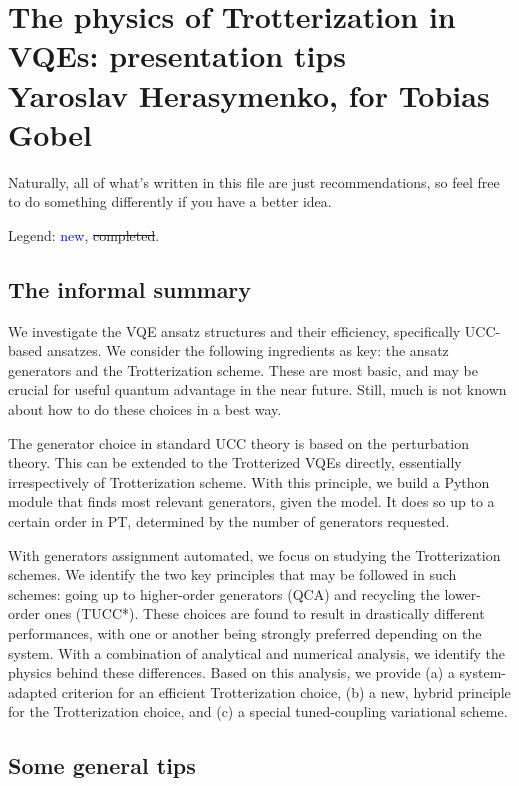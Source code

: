 \documentclass[10pt, a4paper]{article}
\def\blue{\textcolor{blue}}
\begin{document}
\section*{The physics of Trotterization in VQEs: presentation tips\\
\small{Yaroslav Herasymenko, for Tobias Gobel}}


Naturally, all of what's written in this file are just recommendations, so feel free to do something differently if you have a better idea.

Legend: \blue{new}, \st{completed}.

\subsection*{The informal summary}

We investigate the VQE ansatz structures and their efficiency, specifically UCC-based ansatzes. We consider the following ingredients as key: the ansatz generators and the Trotterization scheme. These are most basic, and may be crucial for useful quantum advantage in the near future. Still, much is not known about how to do these choices in a best way.

The generator choice in standard UCC theory is based on the perturbation theory. This can be extended to the Trotterized VQEs directly, essentially irrespectively of Trotterization scheme. With this principle, we build a Python module that finds most relevant generators, given the model. It does so up to a certain order in PT, determined by the number of generators requested.

With generators assignment automated, we focus on studying the Trotterization schemes. We identify the two key principles that may be followed in such schemes: going up to higher-order generators (QCA) and recycling the lower-order ones (TUCC*). These choices are found to result in drastically different performances, with one or another being strongly preferred depending on the system. With a combination of analytical and numerical analysis, we identify the physics behind these differences. Based on this analysis, we provide (a) a system-adapted criterion for an efficient Trotterization choice, (b) a new, hybrid principle for the Trotterization choice, and (c) a special tuned-coupling variational scheme.

\subsection*{Some general tips}
\end{document}

